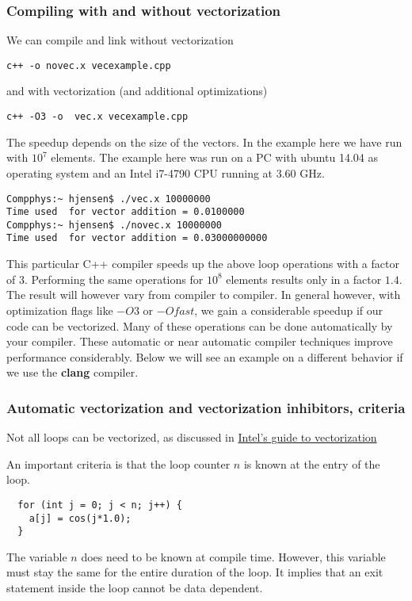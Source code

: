 \documentclass{beamer}
\begin{document}
\begin{frame}
\frametitle{Compiling with and without vectorization}

We can compile and link without vectorization
\begin{verbatim}
c++ -o novec.x vecexample.cpp
\end{verbatim}
and with vectorization (and additional optimizations)
\begin{verbatim}
c++ -O3 -o  vec.x vecexample.cpp 
\end{verbatim}
The speedup depends on the size of the vectors. In the example here we have run with $10^7$ elements.
The example here was run on a PC with ubuntu 14.04 as operating system and an Intel i7-4790 CPU running at 3.60 GHz. 
\begin{verbatim}
Compphys:~ hjensen$ ./vec.x 10000000
Time used  for vector addition = 0.0100000
Compphys:~ hjensen$ ./novec.x 10000000
Time used  for vector addition = 0.03000000000
\end{verbatim}
This particular C++ compiler speeds up the above loop operations with a factor of 3. 
Performing the same operations for $10^8$ elements results only in a factor $1.4$.
The result will however vary from compiler to compiler. In general however, with optimization flags like $-O3$ or $-Ofast$, we gain a considerable speedup if our code can be vectorized. Many of these operations can be done automatically by your compiler. These automatic or near automatic compiler techniques improve performance considerably.  Below we will see an example on a different behavior if we use the \textbf{clang} compiler.
\end{frame}

\begin{frame}
\frametitle{Automatic vectorization and vectorization inhibitors, criteria}

Not all loops can be vectorized, as discussed in \href{{https://software.intel.com/en-us/articles/a-guide-to-auto-vectorization-with-intel-c-compilers}}{Intel's guide to vectorization}

An important criteria is that the loop counter $n$ is known at the entry of the loop.
\begin{verbatim}
  for (int j = 0; j < n; j++) {
    a[j] = cos(j*1.0);
  }
\end{verbatim}
The variable $n$ does need to be known at compile time. However, this variable must stay the same for the entire duration of the loop. It implies that an exit statement inside the loop cannot be data dependent.
\end{frame}
\end{document}
